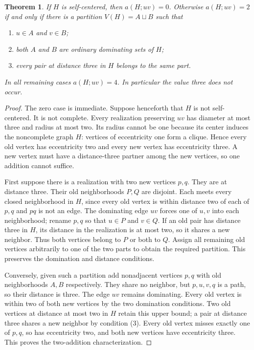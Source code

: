 \documentclass[11pt]{article}
\newtheorem{thm}{Theorem}[section]
\begin{document}
\begin{thm}\label{thm:marked-classification}
If $H$ is self-centered, then $a(H;uv)=0$. Otherwise $a(H;uv)=2$
if and only if there is a partition $V(H)=A\sqcup B$ such that
\begin{enumerate}
\item $u\in A$ and $v\in B$;
\item both $A$ and $B$ are ordinary dominating sets of $H$;
\item every pair at distance three in $H$ belongs to the same part.
\end{enumerate}
In all remaining cases $a(H;uv)=4$. In particular the value three
does not occur.
\end{thm}
\begin{proof}
The zero case is immediate. Suppose henceforth that $H$ is not self-centered.
It is not complete. Every realization preserving $uv$ has diameter at most
three and radius at most two. Its radius cannot be one because its center
induces the noncomplete graph $H$: vertices of eccentricity one form a
clique. Hence every old vertex has eccentricity two and every new vertex
has eccentricity three. A new vertex must have a distance-three partner
among the new vertices, so one addition cannot suffice.

First suppose there is a realization with two new vertices $p,q$. They
are at distance three. Their old neighborhoods $P,Q$ are disjoint.
Each meets every closed neighborhood in $H$, since every old vertex is
within distance two of each of $p,q$ and $pq$ is not an edge.
The dominating edge $uv$ forces one of $u,v$ into each neighborhood;
rename $p,q$ so that $u\in P$ and $v\in Q$.
If an old pair has distance three in $H$, its distance in the
realization is at most two, so it shares a new neighbor. Thus both
vertices belong to $P$ or both to $Q$. Assign all remaining old vertices
arbitrarily to one of the two parts to obtain the required partition.
This preserves the domination and distance conditions.

Conversely, given such a partition add nonadjacent vertices $p,q$
with old neighborhoods $A,B$ respectively. They share no neighbor,
but $p,u,v,q$ is a path, so their distance is three.
The edge $uv$ remains dominating. Every old vertex is within two of
both new vertices by the two domination conditions. Two old vertices
at distance at most two in $H$ retain this upper bound; a pair at
distance three shares a new neighbor by condition (3).
Every old vertex misses exactly one of $p,q$, so has eccentricity
two, and both new vertices have eccentricity three. This proves the
two-addition characterization.


\end{proof}
\end{document}
